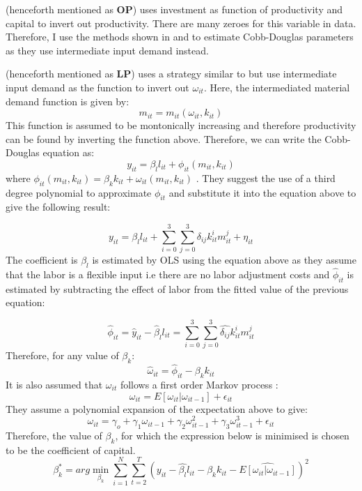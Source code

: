\documentclass[12pt]{article}
\begin{document}
\textcite{olley1992dynamics} (henceforth mentioned as \textbf{OP}) uses investment
 as function of productivity and capital to invert out productivity.  There are many zeroes for this variable in
 data. Therefore, I use the  methods shown in \textcite{levinsohn2003estimating} and
\textcite{ackerberg2006structural} to estimate Cobb-Douglas
parameters as they use  intermediate
input demand instead.  


\textcite{levinsohn2003estimating} (henceforth mentioned as \textbf{LP}) uses a  strategy
similar to \textcite{olley1992dynamics} but use intermediate input demand
as the function to invert out $\omega_{it}$. 
Here, the intermediated material demand function is given by:
$$  m_{it} = m_{it}(\omega_{it}, k_{it})$$
This function is assumed to be montonically increasing and therefore
productivity can be found by inverting the function above. Therefore,
we can write the Cobb-Douglas equation  as: 
$$ y_{it} = \beta_{l}l_{it} + \phi_{it}(m_{it},k_{it})$$
where $\phi_{it}(m_{it},k_{it}) =  \beta_{k}k_{it}+ \omega_{it}(m_{it}, k_{it})$
. They suggest the  use of a third degree polynomial to approximate 
$\phi_{it}$ and substitute it into the equation above to give the
following result: 

$$  y_{it} =  \beta_{l}l_{it} + \sum_{i=0}^{3} \sum_{j=0}^{3}
\delta_{ij}k_{it}^{i}m_{it}^{j} + \eta_{it}$$
The coefficient is $\beta_{l}$ is estimated by OLS using the equation
above as they assume that the labor is a flexible input i.e there are
no labor adjustment costs and $\hat{\phi}_{it}$ is estimated by
subtracting the effect of labor from
the fitted value of the previous equation:


$$ \hat{\phi}_{it} = \hat{y}_{it} - \hat{\beta}_{l}l_{it} =
 \sum_{i=0}^{3} \sum_{j=0}^{3}
\hat{\delta_{ij}}k_{it}^{i}m_{it}^{j}$$
Therefore,  for any value of $\beta_{k}$:
$$\hat{\omega}_{it} = \hat{\phi}_{it} - \beta_{k}k_{it}$$
 It is also assumed that $\omega_{it}$ follows a first order Markov
process : 
$$\omega_{it} = E[\omega_{it}|\omega_{it-1}] + \epsilon_{it}$$
They  assume a polynomial expansion of the expectation above to give:
$$ \omega_{it}=  \gamma_{o}+\gamma_{1}\omega_{it-1} +
\gamma_{2}\omega_{it-1}^2 + \gamma_{3}\omega_{it-1}^3 + \epsilon_{it} $$ 
Therefore, the value of $\beta_{k}$, for which the expression below is
minimised is chosen to be the coefficient of capital.  
\begin{equation}
\beta_{k}^{*} = arg \underset{\beta_{k}}{\min}\sum_{i=1}^{N}\sum_{t=2}^{T} (y_{it} - \hat{\beta_{l}}l_{it} -
\beta_{k}k_{it} - \hat{E[\omega_{it}|\omega_{it-1}]})^2 
\end{equation}
\end{document}
